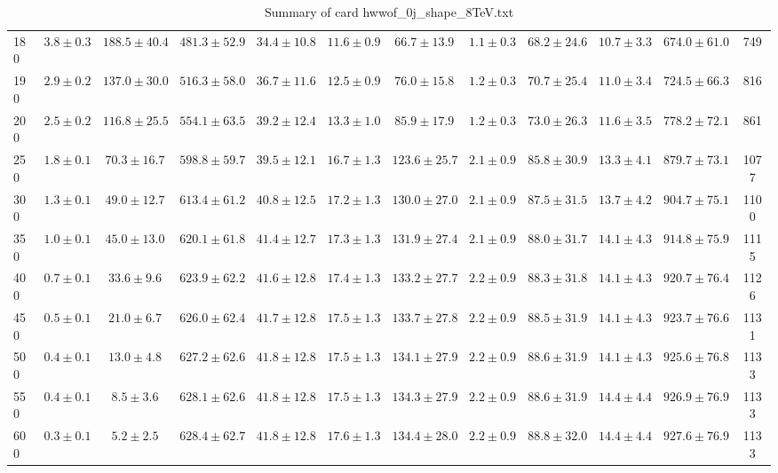 \begin{table}[!htb]
{\begin{center}
\begin{tabular}{l | c c | c c c c c c c  | c c}
180 & $3.8\pm0.3$ & $188.5\pm40.4$ & $481.3\pm52.9$ & $34.4\pm10.8$ & $11.6\pm0.9$ & $66.7\pm13.9$ & $1.1\pm0.3$ & $68.2\pm24.6$ & $10.7\pm3.3$ & $674.0\pm61.0$ & 749 \\
190 & $2.9\pm0.2$ & $137.0\pm30.0$ & $516.3\pm58.0$ & $36.7\pm11.6$ & $12.5\pm0.9$ & $76.0\pm15.8$ & $1.2\pm0.3$ & $70.7\pm25.4$ & $11.0\pm3.4$ & $724.5\pm66.3$ & 816 \\
200 & $2.5\pm0.2$ & $116.8\pm25.5$ & $554.1\pm63.5$ & $39.2\pm12.4$ & $13.3\pm1.0$ & $85.9\pm17.9$ & $1.2\pm0.3$ & $73.0\pm26.3$ & $11.6\pm3.5$ & $778.2\pm72.1$ & 861 \\
250 & $1.8\pm0.1$ & $70.3\pm16.7$ & $598.8\pm59.7$ & $39.5\pm12.1$ & $16.7\pm1.3$ & $123.6\pm25.7$ & $2.1\pm0.9$ & $85.8\pm30.9$ & $13.3\pm4.1$ & $879.7\pm73.1$ & 1077 \\
300 & $1.3\pm0.1$ & $49.0\pm12.7$ & $613.4\pm61.2$ & $40.8\pm12.5$ & $17.2\pm1.3$ & $130.0\pm27.0$ & $2.1\pm0.9$ & $87.5\pm31.5$ & $13.7\pm4.2$ & $904.7\pm75.1$ & 1100 \\
350 & $1.0\pm0.1$ & $45.0\pm13.0$ & $620.1\pm61.8$ & $41.4\pm12.7$ & $17.3\pm1.3$ & $131.9\pm27.4$ & $2.1\pm0.9$ & $88.0\pm31.7$ & $14.1\pm4.3$ & $914.8\pm75.9$ & 1115 \\
400 & $0.7\pm0.1$ & $33.6\pm9.6$ & $623.9\pm62.2$ & $41.6\pm12.8$ & $17.4\pm1.3$ & $133.2\pm27.7$ & $2.2\pm0.9$ & $88.3\pm31.8$ & $14.1\pm4.3$ & $920.7\pm76.4$ & 1126 \\
450 & $0.5\pm0.1$ & $21.0\pm6.7$ & $626.0\pm62.4$ & $41.7\pm12.8$ & $17.5\pm1.3$ & $133.7\pm27.8$ & $2.2\pm0.9$ & $88.5\pm31.9$ & $14.1\pm4.3$ & $923.7\pm76.6$ & 1131 \\
500 & $0.4\pm0.1$ & $13.0\pm4.8$ & $627.2\pm62.6$ & $41.8\pm12.8$ & $17.5\pm1.3$ & $134.1\pm27.9$ & $2.2\pm0.9$ & $88.6\pm31.9$ & $14.1\pm4.3$ & $925.6\pm76.8$ & 1133 \\
550 & $0.4\pm0.1$ & $8.5\pm3.6$ & $628.1\pm62.6$ & $41.8\pm12.8$ & $17.5\pm1.3$ & $134.3\pm27.9$ & $2.2\pm0.9$ & $88.6\pm31.9$ & $14.4\pm4.4$ & $926.9\pm76.9$ & 1133 \\
600 & $0.3\pm0.1$ & $5.2\pm2.5$ & $628.4\pm62.7$ & $41.8\pm12.8$ & $17.6\pm1.3$ & $134.4\pm28.0$ & $2.2\pm0.9$ & $88.8\pm32.0$ & $14.4\pm4.4$ & $927.6\pm76.9$ & 1133 \\
\hline
\end{tabular}
\end{center}
}
\caption{Summary of card hwwof\_0j\_shape\_8TeV.txt}
{%
}
\end{table}
